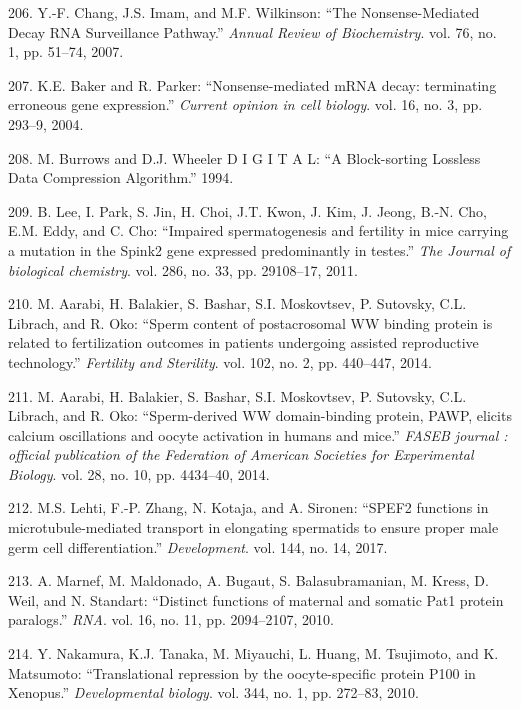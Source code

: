 \documentclass[12pt,a4paper,twoside]{ugathesis}
\theoremstyle{definition}
\theoremstyle{definition}
\theoremstyle{definition}
\theoremstyle{remark}
\begin{document}
\hypertarget{ref-Chang2007}{}
206. Y.-F. Chang, J.S. Imam, and M.F. Wilkinson: ``The Nonsense-Mediated
Decay RNA Surveillance Pathway.'' \emph{Annual Review of Biochemistry}.
vol. 76, no. 1, pp. 51--74, 2007.

\hypertarget{ref-Baker2004}{}
207. K.E. Baker and R. Parker: ``Nonsense-mediated mRNA decay:
terminating erroneous gene expression.'' \emph{Current opinion in cell
biology}. vol. 16, no. 3, pp. 293--9, 2004.

\hypertarget{ref-Burrows1994}{}
208. M. Burrows and D.J. Wheeler D I G I T A L: ``A Block-sorting
Lossless Data Compression Algorithm.'' 1994.

\hypertarget{ref-Lee2011}{}
209. B. Lee, I. Park, S. Jin, H. Choi, J.T. Kwon, J. Kim, J. Jeong,
B.-N. Cho, E.M. Eddy, and C. Cho: ``Impaired spermatogenesis and
fertility in mice carrying a mutation in the Spink2 gene expressed
predominantly in testes.'' \emph{The Journal of biological chemistry}.
vol. 286, no. 33, pp. 29108--17, 2011.

\hypertarget{ref-Aarabi2014}{}
210. M. Aarabi, H. Balakier, S. Bashar, S.I. Moskovtsev, P. Sutovsky,
C.L. Librach, and R. Oko: ``Sperm content of postacrosomal WW binding
protein is related to fertilization outcomes in patients undergoing
assisted reproductive technology.'' \emph{Fertility and Sterility}. vol.
102, no. 2, pp. 440--447, 2014.

\hypertarget{ref-Aarabi2014a}{}
211. M. Aarabi, H. Balakier, S. Bashar, S.I. Moskovtsev, P. Sutovsky,
C.L. Librach, and R. Oko: ``Sperm-derived WW domain-binding protein,
PAWP, elicits calcium oscillations and oocyte activation in humans and
mice.'' \emph{FASEB journal : official publication of the Federation of
American Societies for Experimental Biology}. vol. 28, no. 10, pp.
4434--40, 2014.

\hypertarget{ref-Lehti2017}{}
212. M.S. Lehti, F.-P. Zhang, N. Kotaja, and A. Sironen: ``SPEF2
functions in microtubule-mediated transport in elongating spermatids to
ensure proper male germ cell differentiation.'' \emph{Development}. vol.
144, no. 14, 2017.

\hypertarget{ref-Marnef2010}{}
213. A. Marnef, M. Maldonado, A. Bugaut, S. Balasubramanian, M. Kress,
D. Weil, and N. Standart: ``Distinct functions of maternal and somatic
Pat1 protein paralogs.'' \emph{RNA}. vol. 16, no. 11, pp. 2094--2107,
2010.

\hypertarget{ref-Nakamura2010}{}
214. Y. Nakamura, K.J. Tanaka, M. Miyauchi, L. Huang, M. Tsujimoto, and
K. Matsumoto: ``Translational repression by the oocyte-specific protein
P100 in Xenopus.'' \emph{Developmental biology}. vol. 344, no. 1, pp.
272--83, 2010.
\end{document}

